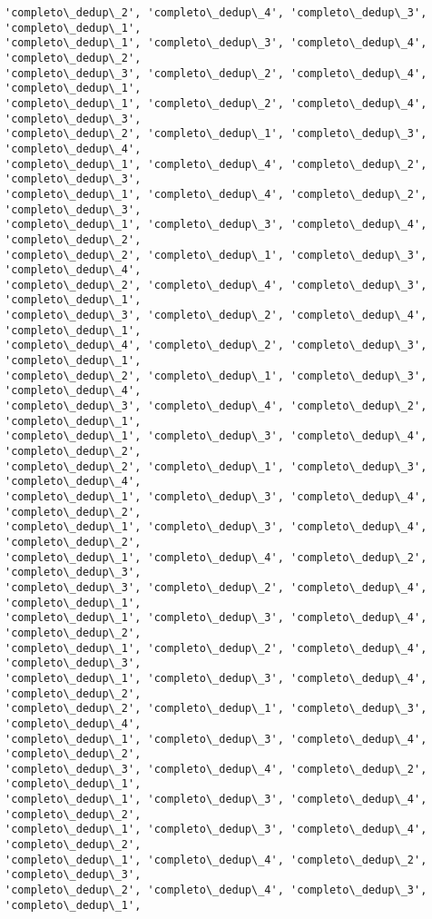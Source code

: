 \documentclass[11pt]{article}
\begin{document}
\begin{Verbatim}[commandchars=\\\{\}]
'completo\_dedup\_2', 'completo\_dedup\_4', 'completo\_dedup\_3', 'completo\_dedup\_1',
'completo\_dedup\_1', 'completo\_dedup\_3', 'completo\_dedup\_4', 'completo\_dedup\_2',
'completo\_dedup\_3', 'completo\_dedup\_2', 'completo\_dedup\_4', 'completo\_dedup\_1',
'completo\_dedup\_1', 'completo\_dedup\_2', 'completo\_dedup\_4', 'completo\_dedup\_3',
'completo\_dedup\_2', 'completo\_dedup\_1', 'completo\_dedup\_3', 'completo\_dedup\_4',
'completo\_dedup\_1', 'completo\_dedup\_4', 'completo\_dedup\_2', 'completo\_dedup\_3',
'completo\_dedup\_1', 'completo\_dedup\_4', 'completo\_dedup\_2', 'completo\_dedup\_3',
'completo\_dedup\_1', 'completo\_dedup\_3', 'completo\_dedup\_4', 'completo\_dedup\_2',
'completo\_dedup\_2', 'completo\_dedup\_1', 'completo\_dedup\_3', 'completo\_dedup\_4',
'completo\_dedup\_2', 'completo\_dedup\_4', 'completo\_dedup\_3', 'completo\_dedup\_1',
'completo\_dedup\_3', 'completo\_dedup\_2', 'completo\_dedup\_4', 'completo\_dedup\_1',
'completo\_dedup\_4', 'completo\_dedup\_2', 'completo\_dedup\_3', 'completo\_dedup\_1',
'completo\_dedup\_2', 'completo\_dedup\_1', 'completo\_dedup\_3', 'completo\_dedup\_4',
'completo\_dedup\_3', 'completo\_dedup\_4', 'completo\_dedup\_2', 'completo\_dedup\_1',
'completo\_dedup\_1', 'completo\_dedup\_3', 'completo\_dedup\_4', 'completo\_dedup\_2',
'completo\_dedup\_2', 'completo\_dedup\_1', 'completo\_dedup\_3', 'completo\_dedup\_4',
'completo\_dedup\_1', 'completo\_dedup\_3', 'completo\_dedup\_4', 'completo\_dedup\_2',
'completo\_dedup\_1', 'completo\_dedup\_3', 'completo\_dedup\_4', 'completo\_dedup\_2',
'completo\_dedup\_1', 'completo\_dedup\_4', 'completo\_dedup\_2', 'completo\_dedup\_3',
'completo\_dedup\_3', 'completo\_dedup\_2', 'completo\_dedup\_4', 'completo\_dedup\_1',
'completo\_dedup\_1', 'completo\_dedup\_3', 'completo\_dedup\_4', 'completo\_dedup\_2',
'completo\_dedup\_1', 'completo\_dedup\_2', 'completo\_dedup\_4', 'completo\_dedup\_3',
'completo\_dedup\_1', 'completo\_dedup\_3', 'completo\_dedup\_4', 'completo\_dedup\_2',
'completo\_dedup\_2', 'completo\_dedup\_1', 'completo\_dedup\_3', 'completo\_dedup\_4',
'completo\_dedup\_1', 'completo\_dedup\_3', 'completo\_dedup\_4', 'completo\_dedup\_2',
'completo\_dedup\_3', 'completo\_dedup\_4', 'completo\_dedup\_2', 'completo\_dedup\_1',
'completo\_dedup\_1', 'completo\_dedup\_3', 'completo\_dedup\_4', 'completo\_dedup\_2',
'completo\_dedup\_1', 'completo\_dedup\_3', 'completo\_dedup\_4', 'completo\_dedup\_2',
'completo\_dedup\_1', 'completo\_dedup\_4', 'completo\_dedup\_2', 'completo\_dedup\_3',
'completo\_dedup\_2', 'completo\_dedup\_4', 'completo\_dedup\_3', 'completo\_dedup\_1',

\end{Verbatim}
\end{document}
